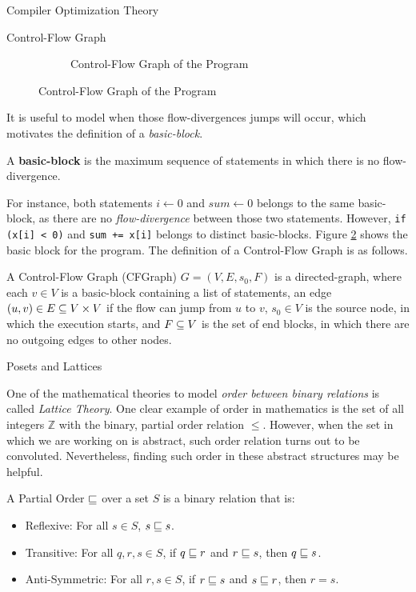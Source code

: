 \begin{section}{Compiler Optimization Theory}
\begin{subsection}{Control-Flow Graph}
\begin{figure}[ht]
\begin{subfigure}[b]{0.40\textwidth}
\begin{center}
{
    }
    \end{center}
  \caption{Control-Flow Graph of the Program}
  \label{fig:1-norm_program:cfg}
  \end{subfigure}
\end{figure}
It is useful to model when those flow-divergences jumps will occur, which
motivates the definition of a \textit{basic-block}.

\begin{definition}
A \textbf{basic-block} is the maximum sequence of statements in which there is
no flow-divergence.
\end{definition}

For instance, both statements $i \leftarrow 0$ and $\textit{sum} \leftarrow 0$ belongs
to the same basic-block, as there are no \textit{flow-divergence} between
those two statements. However, \texttt{if (x[i] < 0)} and \texttt{sum += x[i]}
belongs to distinct basic-blocks. Figure \ref{fig:1-norm_program:cfg} shows
the basic block for the program. The definition of a Control-Flow Graph is
as follows.

\begin{definition}
	A Control-Flow Graph (CFGraph) $G = (V, E, s_0, F)$ is a directed-graph,
	where each $v \in V$ is a basic-block containing a list of statements,
	an edge $(u, v) \in E \subseteq V \times V$ if the flow can jump from
	$u$ to $v$, $s_0 \in V$ is the source node, in which the execution
	starts, and $F \subseteq V$ is the set of end blocks, in which there
	are no outgoing edges to other nodes.
\end{definition}

\end{subsection}

\begin{subsection}{Posets and Lattices}

One of the mathematical theories to model \textit{order between binary
relations} is called \textit{Lattice Theory}. One clear example of order in
mathematics is the set of all integers $\mathbb{Z}$ with the binary, partial
order relation $\leq$. However, when the set in which we are working on is
abstract, such order relation turns out to be convoluted. Nevertheless, finding
such order in these abstract structures may be helpful.

\begin{definition}
A Partial Order $\sqsubseteq$ over a set $S$ is a binary relation that is:
\begin{itemize}
	\item Reflexive: For all $s \in S$, $s \sqsubseteq s$.
	\item Transitive: For all $q, r, s \in S$, if $q \sqsubseteq r$ and $r \sqsubseteq s$, then
	$q \sqsubseteq s$.
	\item Anti-Symmetric: For all $r, s \in S$, if $r \sqsubseteq s$ and $s \sqsubseteq r$,
	then $r = s$.


\end{itemize}
\end{definition}
\end{subsection}
\end{section}
